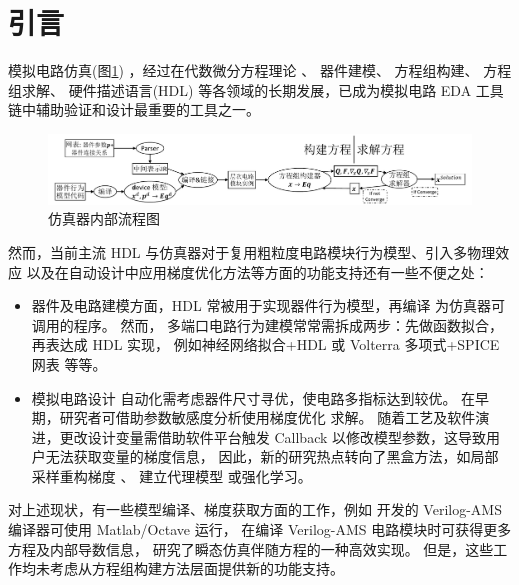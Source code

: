 \section{引言}
模拟电路仿真(图\ref{fig:simulator-flowchart})
\cite{nagel1971computer,mccalla1971bias,Nagel:M382}，经过在代数微分方程理论
\cite{estevez2000structural,kunkel2006differential,gunther2005modelling}、
器件建模\cite{chauhan2012bsim,ezaki2008physics,gildenblat2006psp}、
方程组构建\cite{hachtel1971sparse,ho1975modified,fijnvandraat2002time}、
方程组求解\cite{nastov2007fundamentals,najm2010circuit}、
硬件描述语言(HDL)\cite{verilog2014verilog,ieee2006ieee-1364-2005,
lemaitre2002adms,christen1999vhdl,pecheux2005vhdl}
等各领域的长期发展，已成为模拟电路 EDA 工具链中辅助验证和设计最重要的工具之一。
\begin{figure}[htpb]
  \centering
  \includegraphics[width=1.0\textwidth]{fig/simulator-flowchart.pdf}
  \caption{仿真器内部流程图}
  \label{fig:simulator-flowchart}
\end{figure}
然而，当前主流 HDL 与仿真器对于复用粗粒度电路模块行为模型、引入多物理效应
以及在自动设计中应用梯度优化方法等方面的功能支持还有一些不便之处：
\begin{itemize}[partopsep=0pt,topsep=0pt,itemsep=0pt,parsep=0pt]
  \item
    器件及电路建模方面，HDL 常被用于实现器件行为模型，再编译
    \cite{lemaitre2002adms}为仿真器可调用的程序。 然而，%
    多端口电路行为建模常常需拆成两步：先做函数拟合，再表达成 HDL 实现，
    例如神经网络拟合\cite{meijer2001neural,zhang2017artificial}+HDL
    或 Volterra 多项式\cite{zhang2014large}+SPICE 网表
    等等\cite{zhang2019new,roymohapatra2019novel}。
  \item
    模拟电路设计\cite{razavi2002design,silveira1996g,jespers2009gm}
    自动化需考虑器件尺寸寻优，使电路多指标达到较优。
    在早期，研究者可借助参数敏感度分析使用梯度优化
    \cite{zhan2004optimization,agrawal2006circuit}求解。
    随着工艺及软件演进，更改设计变量需借助软件平台触发 Callback
    以修改模型参数，这导致用户无法获取变量的梯度信息，
    因此，新的研究热点转向了黑盒方法，如局部采样重构梯度
    \cite{huang2013efficient,nieuwoudt2005multi,peng2016efficient}、
    建立代理模型
    \cite{girardi2011analog,lyu2018batch,wang2014enabling,lyu2017efficient}
    或强化学习\cite{tang2018parametric}。
\end{itemize}
对上述现状，有一些模型编译、梯度获取方面的工作，例如 \citet{mahmutoglu2018new}
开发的 Verilog-AMS 编译器可使用 Matlab/Octave 运行，\citet{kuthe2020verilogae}
在编译 Verilog-AMS 电路模块时可获得更多方程及内部导数信息，
\citet{hu2020adjoint} 研究了瞬态仿真伴随方程的一种高效实现。
但是，这些工作均未考虑从方程组构建方法层面提供新的功能支持。


